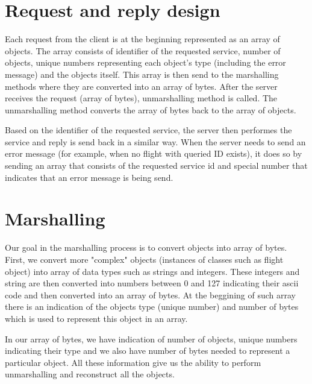 \documentclass[12pt,a4paper]{article}
\begin{document}
\section{Request and reply design}
Each request from the client is at the beginning represented as an array of objects. The array consists of identifier of the requested service, number of objects, unique numbers representing each object's type (including the error message) and the objects itself. This array is then send to the marshalling methods where they are converted into an array of bytes. After the server receives the request (array of bytes), unmarshalling method is called. The unmarshalling method converts the array of bytes back to the array of objects.\par \medskip Based on the identifier of the requested service, the server then performes the service and reply is send back in a similar way. When the server needs to send an error message (for example, when no flight with queried ID exists), it does so by sending an array that consists of the requested service id and special number that indicates that an error message is being send.  

\section{Marshalling}
Our goal in the marshalling process is to convert objects into array of bytes. First, we convert more "complex" objects (instances of classes such as flight object) into array of data types such as strings and integers. These integers and string are then converted into numbers between 0 and 127 indicating their ascii code and then converted into an array of bytes. At the beggining of such array there is an indication of the objects type (unique number) and number of bytes which is used to represent this object in an array.\par \medskip
In our array of bytes, we have indication of number of objects, unique numbers indicating their type and we also have number of bytes needed to represent a particular object. All these information give us the ability to perform unmarshalling and reconstruct all the objects. 
\pagebreak
\end{document}
